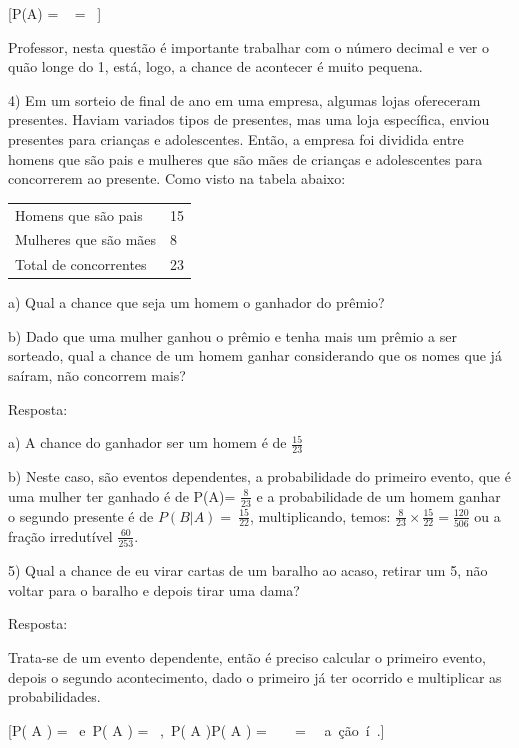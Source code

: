 [P(A) = \  \times {} \times {} \times {} = \ ]

Professor, nesta questão é importante trabalhar com o número decimal e
ver o quão longe do 1, está, logo, a chance de acontecer é muito
pequena.

4) Em um sorteio de final de ano em uma empresa, algumas lojas
ofereceram presentes. Haviam variados tipos de presentes, mas uma loja
específica, enviou presentes para crianças e adolescentes. Então, a
empresa foi dividida entre homens que são pais e mulheres que são mães
de crianças e adolescentes para concorrerem ao presente. Como visto na
tabela abaixo:

\begin{longtable}[]{@{}ll@{}}
\toprule
\endhead
Homens que são pais & 15\tabularnewline
Mulheres que são mães & 8\tabularnewline
Total de concorrentes & 23\tabularnewline
\bottomrule
\end{longtable}

a) Qual a chance que seja um homem o ganhador do prêmio?

b) Dado que uma mulher ganhou o prêmio e tenha mais um prêmio a ser
sorteado, qual a chance de um homem ganhar considerando que os nomes que
já saíram, não concorrem mais?

Resposta:

a) A chance do ganhador ser um homem é de \(\frac{15}{23}\)

b) Neste caso, são eventos dependentes, a probabilidade do primeiro
evento, que é uma mulher ter ganhado é de P(A)= \(\frac{8}{23}\) e a
probabilidade de um homem ganhar o segundo presente é de
\(P(B|A) = \ \frac{15}{22}\), multiplicando, temos:
\(\frac{8}{23} \times \frac{15}{22} = \frac{120}{506}\) ou a fração
irredutível \(\frac{60}{253}.\)

5) Qual a chance de eu virar cartas de um baralho ao acaso, retirar um
5, não voltar para o baralho e depois tirar uma dama?

Resposta:

Trata-se de um evento dependente, então é preciso calcular o primeiro
evento, depois o segundo acontecimento, dado o primeiro já ter ocorrido
e multiplicar as probabilidades.

[P\left( A \right) = \ e\ P\left( A \right) = \ ,\ P\left( A \right)P\left( A \right) = \  \times \  = \ \ a\ ção\ í\ .]

